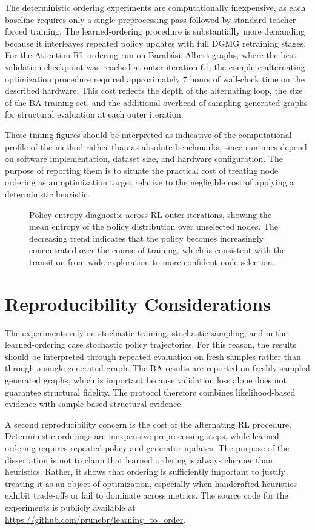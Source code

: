 The deterministic ordering experiments are computationally inexpensive, as each baseline requires only a single preprocessing pass followed by standard teacher-forced training. The learned-ordering procedure is substantially more demanding because it interleaves repeated policy updates with full DGMG retraining stages. For the Attention RL ordering run on Barab\'asi--Albert graphs, where the best validation checkpoint was reached at outer iteration 61, the complete alternating optimization procedure required approximately 7 hours of wall-clock time on the described hardware. This cost reflects the depth of the alternating loop, the size of the BA training set, and the additional overhead of sampling generated graphs for structural evaluation at each outer iteration.

These timing figures should be interpreted as indicative of the computational profile of the method rather than as absolute benchmarks, since runtimes depend on software implementation, dataset size, and hardware configuration. The purpose of reporting them is to situate the practical cost of treating node ordering as an optimization target relative to the negligible cost of applying a deterministic heuristic.

\begin{figure}[H]
    \centering
    \caption{Policy-entropy diagnostic across RL outer iterations, showing the mean entropy of the policy distribution over unselected nodes. The decreasing trend indicates that the policy becomes increasingly concentrated over the course of training, which is consistent with the transition from wide exploration to more confident node selection.}
    \label{fig:rl-entropy-mean}
\end{figure}

\section{Reproducibility Considerations}
\label{sec:protocol-reproducibility}

The experiments rely on stochastic training, stochastic sampling, and in the learned-ordering case stochastic policy trajectories. For this reason, the results should be interpreted through repeated evaluation on fresh samples rather than through a single generated graph. The BA results are reported on freshly sampled generated graphs, which is important because validation loss alone does not guarantee structural fidelity. The protocol therefore combines likelihood-based evidence with sample-based structural evidence.

A second reproducibility concern is the cost of the alternating RL procedure. Deterministic orderings are inexpensive preprocessing steps, while learned ordering requires repeated policy and generator updates. The purpose of the dissertation is not to claim that learned ordering is always cheaper than heuristics. Rather, it shows that ordering is sufficiently important to justify treating it as an object of optimization, especially when handcrafted heuristics exhibit trade-offs or fail to dominate across metrics. The source code for the experiments is publicly available at \url{https://github.com/prunebr/learning_to_order}.
